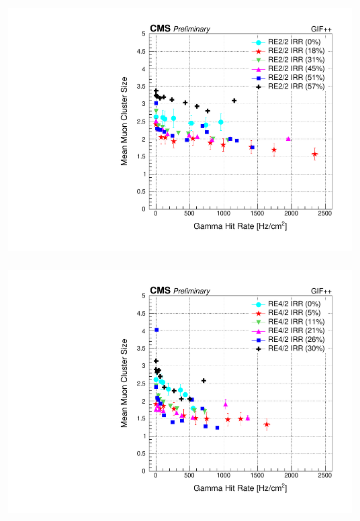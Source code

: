 	\begin{figure}[H]
    	\begin{subfigure}{0.5\linewidth}
			\centering
    		\includegraphics[width = \linewidth]{fig/chapt5/RE2-2_IRR_muon_cluster_vs_Rate.pdf}
        	\caption{\label{fig:GIFpp_cls_vs_rate:A}}
    	\end{subfigure}
    	\begin{subfigure}{0.5\linewidth}
			\centering
    		\includegraphics[width = \linewidth]{fig/chapt5/RE4-2_IRR_muon_cluster_vs_Rate.pdf}
        	\caption{\label{fig:GIFpp_cls_vs_rate:B}}
    	\end{subfigure}
    	\begin{subfigure}{0.5\linewidth}
			\centering

\end{subfigure}
\end{figure}
